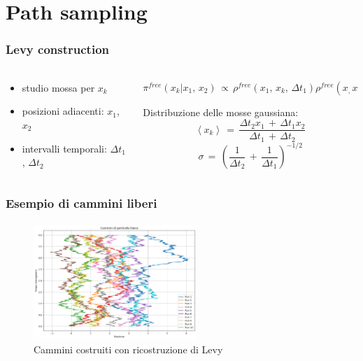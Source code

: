 \section{Path sampling}

\begin{frame}
    \frametitle{Levy construction}
    \framesubtitle{}
  
    \begin{columns}
      \begin{column}{0.4\textwidth}
        \begin{itemize}[itemsep=0.5em, label=$\bullet$]
            \item studio mossa per $x_k$
            \item posizioni adiacenti: $x_1$, $x_2$
            \item intervalli temporali: $\Delta t_1$, $\Delta t_2$
        \end{itemize}

      \end{column}
      
      \begin{column}{0.6\textwidth}
        $$
            \pi^{free}\left(x_k | x_1,\,x_2\right)\,\propto\,\rho^{free}\left(x_1,\,x_k,\,\Delta t_1\right)\rho^{free}\left(x_,\,x_2,\,\Delta t_2\right)
        $$

        \vspace{12pt}
        \centering
        Distribuzione delle mosse gaussiana:
        $$
            \left<x_k\right>\,=\,\frac{\Delta t_2 x_1\,+\,\Delta t_1 x_2}{\Delta t_1\,+\,\Delta t_2}
        $$
        $$
            \sigma\,=\,\left(\frac{1}{\Delta t_2}\,+\,\frac{1}{\Delta t_1}\right)^{-1/2}
        $$
        
      \end{column}
    \end{columns}
  
\end{frame}


\begin{frame}
    \frametitle{Esempio di cammini liberi}
    \framesubtitle{}
  
    \begin{figure}
        \includegraphics[width=0.55\textwidth]{Immagini/esempioPath.png}
        \caption{Cammini costruiti con ricostruzione di Levy}
    \end{figure}
  
\end{frame}
